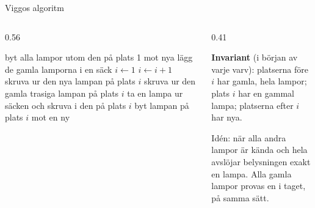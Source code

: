\documentclass[11pt,aspectratio=169,xcolor=table,t]{beamer}
\begin{document}
\begin{frame}{Viggos algoritm}
\begin{columns}[T]
\begin{column}{0.56\textwidth}
\footnotesize
\begin{algorithmic}[1]
\State byt alla lampor utom den på plats 1 mot nya
\State lägg de gamla lamporna i en säck
\State $i\gets1$
    \State $i\gets i+1$
    \State skruva ur den nya lampan på plats $i$
  \Else
    \State skruva ur den gamla trasiga lampan på plats $i$
  \EndIf
  \State ta en lampa ur säcken och skruva i den på plats $i$
\EndWhile
{}
  \State byt lampan på plats $i$ mot en ny
\EndIf
\end{algorithmic}
\end{column}
\begin{column}{0.41\textwidth}
\begin{infobox}[fontupper=\footnotesize]
\textbf{Invariant} (i början av varje varv): platserna före $i$ har gamla, hela lampor;
plats $i$ har en gammal lampa; platserna efter $i$ har nya.
\end{infobox}
\begin{ahabox}[fontupper=\footnotesize]
Idén: när alla andra lampor är kända och hela avslöjar belysningen exakt en lampa. Alla
gamla lampor provas en i taget, på samma sätt.
\end{ahabox}
\end{column}
\end{columns}
\end{frame}
\end{document}
